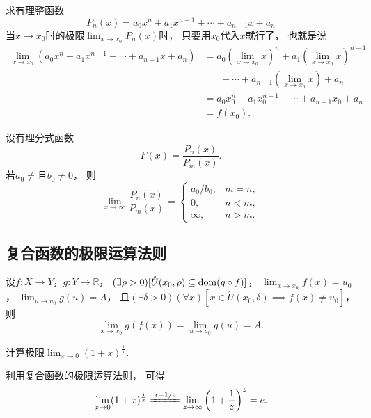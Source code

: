 \begin{example}\label{example:极限.有理整函数在一点的极限}
求有理整函数\[
	P_n(x) = a_0 x^n + a_1 x^{n-1} + \dotsb + a_{n-1} x + a_n
\]当\(x\to x_0\)时的极限\(\lim_{x\to x_0} P_n(x)\)时，
只要用\(x_0\)代入\(x\)就行了，
也就是说\begin{align*}
	\lim_{x \to x_0} (a_0 x^n + a_1 x^{n-1} + \dotsb + a_{n-1} x + a_n)
	&= a_0 \left(\lim_{x \to x_0} x\right)^n
		+ a_1 \left(\lim_{x \to x_0} x\right)^{n-1} \\
	&\hspace{20pt}+ \dotsb
		+ a_{n-1} \left(\lim_{x \to x_0} x\right)
		+ a_n \\
	&= a_0 x_0^n + a_1 x_0^{n-1} + \dotsb + a_{n-1} x_0 + a_n \\
	&= f(x_0).
\end{align*}
\end{example}

\begin{example}
设有理分式函数\[
	F(x) = \frac{P_n(x)}{P_m(x)}.
\]
若\(a_0\neq\)且\(b_0\neq0\)，
则\[
	\lim_{x\to\infty} \frac{P_n(x)}{P_m(x)}
	= \left\{ \begin{array}{cl}
		a_0/b_0, & m=n, \\
		0, & n<m, \\
		\infty, & n>m.
	\end{array} \right.
\]
\end{example}

\subsection{复合函数的极限运算法则}
\begin{theorem}
设\(f\colon X\to Y\)，\(g\colon Y\to\mathbb{R}\)，
\((\exists\rho>0)[\mathring{U}(x_0,\rho) \subseteq \operatorname{dom}(g \circ f)]\)，
\(\lim_{x \to x_0} f(x) = u_0\)，
\(\lim_{u \to u_0} g(u) = A\)，
且\((\exists\delta>0)(\forall x)[x\in\mathring{U}(x_0,\delta) \implies f(x)\neq u_0]\)，
则\[
	\lim_{x \to x_0} g(f(x))
	= \lim_{u \to u_0} g(u)
	= A.
\]
\end{theorem}


\begin{example}
计算极限\(\lim_{x\to0} (1+x)^{\frac1x}\).
\begin{solution}
利用复合函数的极限运算法则，
可得\[
	\lim_{x\to0} (1+x)^{\frac1x}
	\xlongequal{x=1/z}
	\lim_{z\to\infty} \left(1+\frac1z\right)^z
	= e.
\]
\end{solution}
\end{example}

